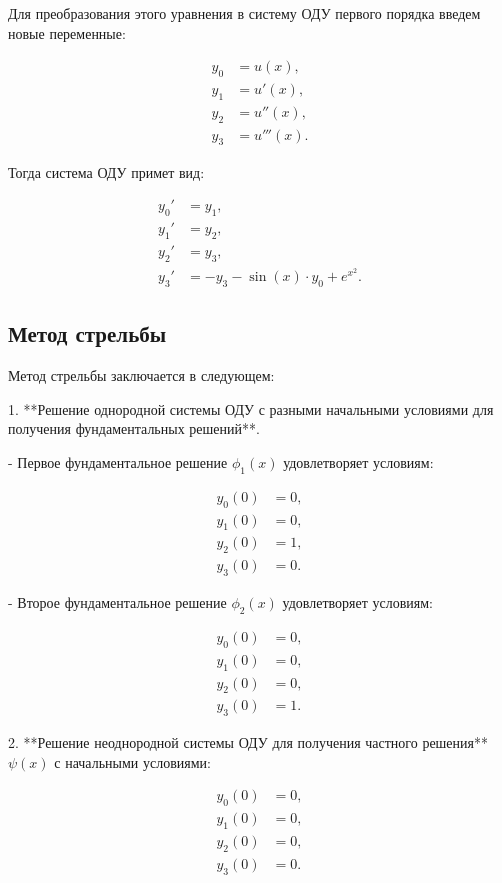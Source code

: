 \documentclass{article}
\begin{document}
Для преобразования этого уравнения в систему ОДУ первого порядка введем новые переменные:

\begin{align}
y_0 &= u(x), \\
y_1 &= u'(x), \\
y_2 &= u''(x), \\
y_3 &= u'''(x).
\end{align}

Тогда система ОДУ примет вид:

\begin{align}
y_0' &= y_1, \\
y_1' &= y_2, \\
y_2' &= y_3, \\
y_3' &= -y_3 - \sin(x) \cdot y_0 + e^{x^2}.
\end{align}

\subsection{Метод стрельбы}

Метод стрельбы заключается в следующем:

1. **Решение однородной системы ОДУ с разными начальными условиями для получения фундаментальных решений**.

   - Первое фундаментальное решение $\phi_1(x)$ удовлетворяет условиям:

     \begin{align}
     y_0(0) &= 0, \\
     y_1(0) &= 0, \\
     y_2(0) &= 1, \\
     y_3(0) &= 0.
     \end{align}

   - Второе фундаментальное решение $\phi_2(x)$ удовлетворяет условиям:

     \begin{align}
     y_0(0) &= 0, \\
     y_1(0) &= 0, \\
     y_2(0) &= 0, \\
     y_3(0) &= 1.
     \end{align}

2. **Решение неоднородной системы ОДУ для получения частного решения** $\psi(x)$ с начальными условиями:

   \begin{align}
   y_0(0) &= 0, \\
   y_1(0) &= 0, \\
   y_2(0) &= 0, \\
   y_3(0) &= 0.
   \end{align}
\end{document}
